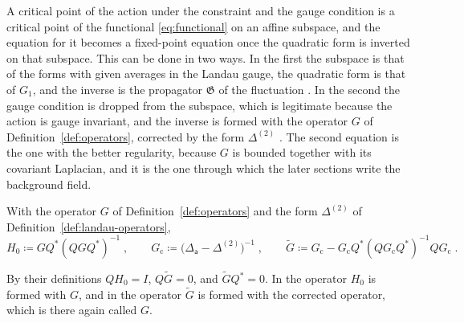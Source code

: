 \documentclass[11pt]{preprint}
\numberwithin{equation}{section}
\begin{document}
A critical point of the action under the constraint and the gauge condition is a critical point of the functional \eqref{eq:functional} on an affine subspace, and the equation for it becomes a fixed-point equation once the quadratic form is inverted on that subspace. This can be done in two ways. In the first the subspace is that of the forms with given averages in the Landau gauge, the quadratic form is that of $G_1$, and the inverse is the propagator $\mathfrak G$ of the fluctuation \cite[(99)--(111)]{BalabanVAR}. In the second the gauge condition is dropped from the subspace, which is legitimate because the action is gauge invariant, and the inverse is formed with the operator $G$ of Definition~\ref{def:operators}, corrected by the form $\Delta^{(2)}$ \cite[(127)--(143), (179), (180)]{BalabanVAR}. The second equation is the one with the better regularity, because $G$ is bounded together with its covariant Laplacian, and it is the one through which the later sections write the background field.

\begin{definition}\label{def:second-operators}
With the operator $G$ of Definition~\ref{def:operators} and the form $\Delta^{(2)}$ of Definition~\ref{def:landau-operators},
\begin{equation}\label{eq:second-operators}
    H_0 \coloneqq GQ^*(QGQ^*)^{-1}\;,
    \qquad
    G_{\mathrm c} \coloneqq \bigl(\Delta_{\mathsf a} - \Delta^{(2)}\bigr)^{-1}\;,
    \qquad
    \tilde G \coloneqq G_{\mathrm c} - G_{\mathrm c}Q^*(QG_{\mathrm c}Q^*)^{-1}QG_{\mathrm c}\;.
\end{equation}
\end{definition}

By their definitions $QH_0 = I$, $Q\tilde G = 0$, and $\tilde GQ^* = 0$. In \cite[(129), p.~297]{BalabanVAR} the operator $H_0$ is formed with $G$, and in \cite[(180), p.~306]{BalabanVAR} the operator $\tilde G$ is formed with the corrected operator, which is there again called $G$.
\end{document}
